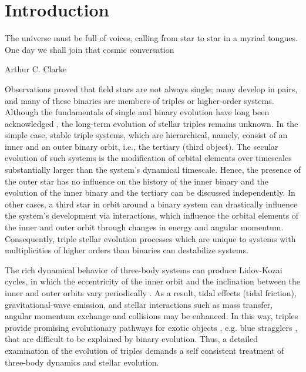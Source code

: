 \chapter{Introduction}

\epigraph{The universe must be full of voices, calling from star to star in a myriad tongues. One day we shall join that cosmic conversation}{Arthur C. Clarke}

Observations proved that field stars are not always single; many develop in pairs, and many of these binaries are members of triples or higher-order systems. Although the fundamentals of single and binary evolution have long been acknowledged \citep{postnov2014evolution,toonen2014popcorn}, the long-term evolution of stellar triples remains unknown. In the simple case, stable triple systems, which are hierarchical, namely, consist of an inner and an outer binary orbit, i.e., the tertiary (third object). The secular evolution of such systems is the modification of orbital elements over timescales substantially larger than the system's dynamical timescale. Hence, the presence of the outer star has no influence on the history of the inner binary and the evolution of the inner binary and the tertiary can be discussed independently. In other cases, a third star in orbit around a binary system can drastically influence the system's development
via interactions, which influence the orbital elements of the inner and outer orbit through changes in energy and angular momentum. Consequently, triple stellar evolution processes which are unique to systems with multiplicities of higher orders than binaries can destabilize systems.

The rich dynamical behavior of three-body systems can produce Lidov-Kozai cycles, in which the eccentricity of the inner orbit and the inclination between the inner and outer orbits vary periodically \citep{michaely2014secular,toonen2016evolution,mangipudi2022extreme}. As a result, tidal effects (tidal friction), gravitational-wave emission, and stellar interactions such as mass transfer, angular momentum exchange and collisions may be enhanced. In this way, triples provide promising evolutionary pathways for exotic objects \citep{sana2012binary, toonen2016evolution}, e.g. blue stragglers \citep{winn2009spin}, that are difficult to be explained by binary evolution. Thus, a detailed examination of the evolution of triples demands a self consistent treatment of three-body dynamics and stellar evolution.

